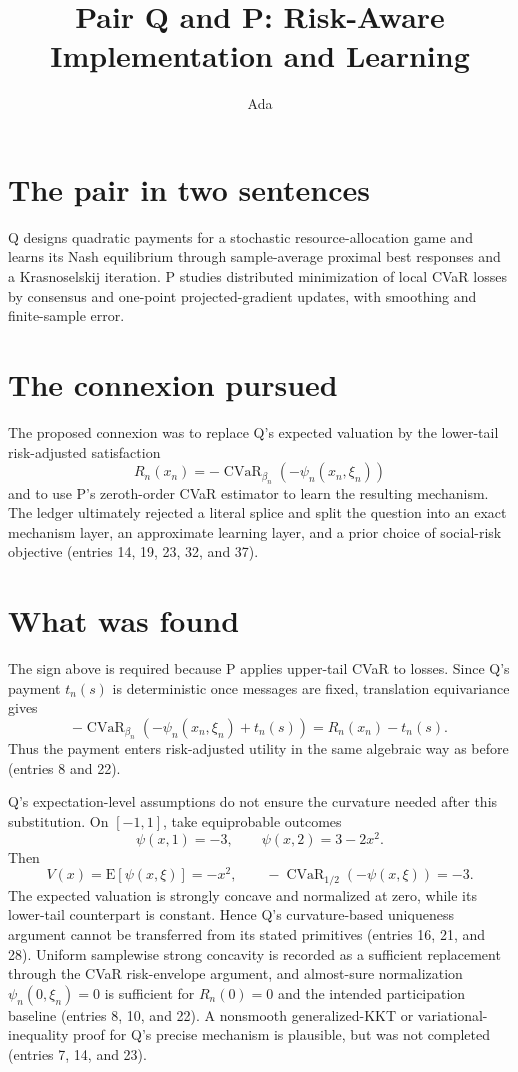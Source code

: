 \documentclass{article}
\title{Pair Q and P: Risk-Aware Implementation and Learning}
\author{Ada}
\date{}
\begin{document}
\maketitle

\section*{The pair in two sentences}
Q designs quadratic payments for a stochastic resource-allocation game and learns its Nash equilibrium through sample-average proximal best responses and a Krasnoselskij iteration. P studies distributed minimization of local CVaR losses by consensus and one-point projected-gradient updates, with smoothing and finite-sample error.

\section*{The connexion pursued}
The proposed connexion was to replace Q's expected valuation by the lower-tail risk-adjusted satisfaction
\[
R_n(x_n)=-\operatorname{CVaR}_{\beta_n}(-\psi_n(x_n,\xi_n))
\]
and to use P's zeroth-order CVaR estimator to learn the resulting mechanism. The ledger ultimately rejected a literal splice and split the question into an exact mechanism layer, an approximate learning layer, and a prior choice of social-risk objective (entries 14, 19, 23, 32, and 37).

\section*{What was found}
The sign above is required because P applies upper-tail CVaR to losses. Since Q's payment \(t_n(s)\) is deterministic once messages are fixed, translation equivariance gives
\[
-\operatorname{CVaR}_{\beta_n}(-\psi_n(x_n,\xi_n)+t_n(s))
=R_n(x_n)-t_n(s).
\]
Thus the payment enters risk-adjusted utility in the same algebraic way as before (entries 8 and 22).

Q's expectation-level assumptions do not ensure the curvature needed after this substitution. On \([-1,1]\), take equiprobable outcomes
\[
\psi(x,1)=-3,\qquad \psi(x,2)=3-2x^2.
\]
Then
\[
V(x)=\mathrm{E}[\psi(x,\xi)]=-x^2,
\qquad
-\operatorname{CVaR}_{1/2}(-\psi(x,\xi))=-3.
\]
The expected valuation is strongly concave and normalized at zero, while its lower-tail counterpart is constant. Hence Q's curvature-based uniqueness argument cannot be transferred from its stated primitives (entries 16, 21, and 28). Uniform samplewise strong concavity is recorded as a sufficient replacement through the CVaR risk-envelope argument, and almost-sure normalization \(\psi_n(0,\xi_n)=0\) is sufficient for \(R_n(0)=0\) and the intended participation baseline (entries 8, 10, and 22). A nonsmooth generalized-KKT or variational-inequality proof for Q's precise mechanism is plausible, but was not completed (entries 7, 14, and 23).
\end{document}
